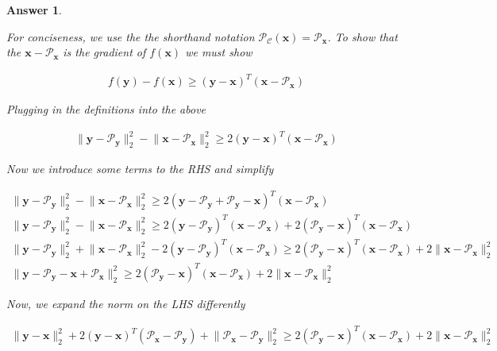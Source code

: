 \documentclass[12pt]{article}
\theoremstyle{colon}
\newtheorem*{answer}{Answer}
\begin{document}
\begin{answer}
  \

  For conciseness, we use the the shorthand notation $\mathcal{P}_\mathcal{C}(\bm{x}) = \mathcal{P}_{\bm{x}}$. To show that the $\bm{x} - \mathcal{P}_{\bm{x}}$ is the gradient of $f(\bm{x})$ we must show

  \begin{gather*}
    f(\bm{y}) - f(\bm{x}) \geq (\bm{y} - \bm{x})^T (\bm{x} - \mathcal{P}_{\bm{x}})
  \end{gather*}

  Plugging in the definitions into the above

  \begin{gather*}
    \lVert \bm{y} - \mathcal{P}_{\bm{y}} \rVert_2^2 - \lVert \bm{x} - \mathcal{P}_{\bm{x}} \rVert_2^2  \geq 2(\bm{y} - \bm{x})^T (\bm{x} - \mathcal{P}_{\bm{x}})
  \end{gather*}

  Now we introduce some terms to the RHS and simplify

  \begin{gather*}
    \lVert \bm{y} - \mathcal{P}_{\bm{y}} \rVert_2^2 - \lVert \bm{x} - \mathcal{P}_{\bm{x}} \rVert_2^2  \geq 2(\bm{y} - \mathcal{P}_{\bm{y}} + \mathcal{P}_{\bm{y}} - \bm{x})^T (\bm{x} - \mathcal{P}_{\bm{x}}) \\
    \lVert \bm{y} - \mathcal{P}_{\bm{y}} \rVert_2^2 - \lVert \bm{x} - \mathcal{P}_{\bm{x}} \rVert_2^2  \geq 2(\bm{y} - \mathcal{P}_{\bm{y}})^T (\bm{x} - \mathcal{P}_{\bm{x}}) + 2(\mathcal{P}_{\bm{y}} - \bm{x})^T (\bm{x} - \mathcal{P}_{\bm{x}}) \\
    \lVert \bm{y} - \mathcal{P}_{\bm{y}} \rVert_2^2 + \lVert \bm{x} - \mathcal{P}_{\bm{x}} \rVert_2^2 - 2(\bm{y} - \mathcal{P}_{\bm{y}})^T (\bm{x} - \mathcal{P}_{\bm{x}})  \geq 2(\mathcal{P}_{\bm{y}} - \bm{x})^T (\bm{x} - \mathcal{P}_{\bm{x}}) + 2 \lVert \bm{x} - \mathcal{P}_{\bm{x}} \rVert_2^2 \\
    \lVert \bm{y} - \mathcal{P}_{\bm{y}} - \bm{x} + \mathcal{P}_{\bm{x}} \rVert_2^2 \geq 2(\mathcal{P}_{\bm{y}} - \bm{x})^T (\bm{x} - \mathcal{P}_{\bm{x}}) + 2 \lVert \bm{x} - \mathcal{P}_{\bm{x}} \rVert_2^2
  \end{gather*}

  Now, we expand the norm on the LHS differently

  \begin{gather*}
    \lVert \bm{y} - \bm{x} \rVert_2^2 +2(\bm{y} - \bm{x})^T (\mathcal{P}_{\bm{x}} - \mathcal{P}_{\bm{y}}) + \lVert \mathcal{P}_{\bm{x}} - \mathcal{P}_{\bm{y}} \rVert_2^2  \geq 2(\mathcal{P}_{\bm{y}} - \bm{x})^T (\bm{x} - \mathcal{P}_{\bm{x}}) + 2 \lVert \bm{x} - \mathcal{P}_{\bm{x}} \rVert_2^2
  \end{gather*}


\end{answer}
\end{document}
